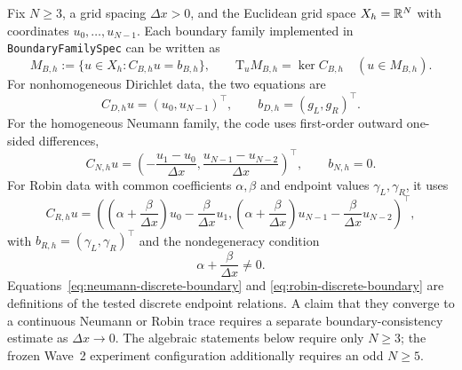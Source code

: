 Fix $N\geq3$, a grid spacing $\Delta x>0$, and the Euclidean grid space $X_h=\mathbb{R}^N$ with coordinates $u_0,\ldots,u_{N-1}$.  Each boundary family implemented in \texttt{BoundaryFamilySpec} can be written as
\begin{equation}\label{eq:affine-boundary-set}
M_{B,h}:=\{u\in X_h:C_{B,h}u=b_{B,h}\},\qquad \mathrm{T}_uM_{B,h}=\ker C_{B,h}\quad (u\in M_{B,h}).
\end{equation}
For nonhomogeneous Dirichlet data, the two equations are
\begin{equation}\label{eq:dirichlet-discrete-boundary}
C_{D,h}u=(u_0,u_{N-1})^\top,\qquad b_{D,h}=(g_L,g_R)^\top.
\end{equation}
For the homogeneous Neumann family, the code uses first-order outward one-sided differences,
\begin{equation}\label{eq:neumann-discrete-boundary}
C_{N,h}u=\left(-\frac{u_1-u_0}{\Delta x},\frac{u_{N-1}-u_{N-2}}{\Delta x}\right)^\top,\qquad b_{N,h}=0.
\end{equation}
For Robin data with common coefficients $\alpha,\beta$ and endpoint values $\gamma_L,\gamma_R$, it uses
\begin{equation}\label{eq:robin-discrete-boundary}
C_{R,h}u=\left(\left(\alpha+\frac{\beta}{\Delta x}\right)u_0-\frac{\beta}{\Delta x}u_1,\left(\alpha+\frac{\beta}{\Delta x}\right)u_{N-1}-\frac{\beta}{\Delta x}u_{N-2}\right)^\top,
\end{equation}
with $b_{R,h}=(\gamma_L,\gamma_R)^\top$ and the nondegeneracy condition
\begin{equation}\label{eq:robin-nondegenerate}
\alpha+\frac{\beta}{\Delta x}\neq0.
\end{equation}
Equations~\eqref{eq:neumann-discrete-boundary} and \eqref{eq:robin-discrete-boundary} are definitions of the tested discrete endpoint relations.  A claim that they converge to a continuous Neumann or Robin trace requires a separate boundary-consistency estimate as $\Delta x\to0$.
The algebraic statements below require only $N\geq3$; the frozen Wave~2 experiment configuration additionally requires an odd $N\geq5$.

